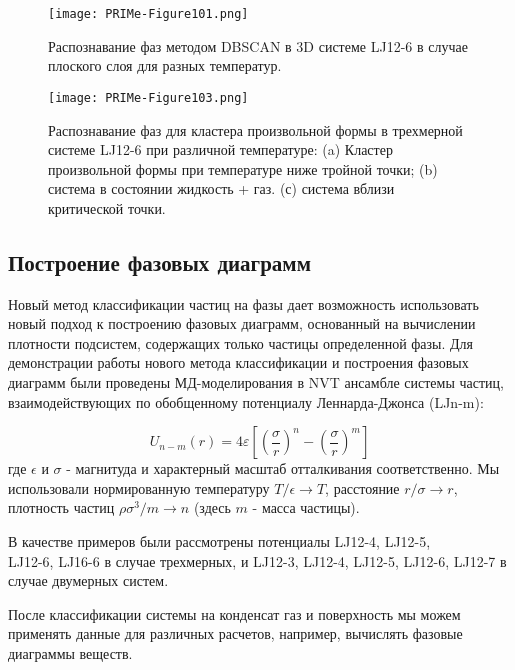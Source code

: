 \begin{figure}[!t]
    \centering
    \texttt{[image: PRIMe-Figure101.png]}
    \caption{Распознавание фаз методом DBSCAN в 3D системе LJ12-6 в случае плоского слоя для разных температур.}
    \label{D3_flat_layer}
\end{figure}


\begin{figure}[!t]
    \centering
    \texttt{[image: PRIMe-Figure103.png]}
    \caption{Распознавание фаз для кластера произвольной формы в трехмерной системе LJ12-6 при различной температуре: (a) Кластер произвольной формы при температуре ниже тройной точки; (b) система в состоянии жидкость + газ. (с) система вблизи критической точки.}
    \label{D3_free_conf}
\end{figure}



\subsection{Построение фазовых диаграмм}
\label{PRIMe-SubSecPhaseDiagram}

Новый метод классификации частиц на фазы дает возможность использовать новый подход к построению фазовых диаграмм, основанный на вычислении плотности подсистем, содержащих только частицы определенной фазы.
Для демонстрации работы нового метода классификации и построения фазовых диаграмм были проведены МД-моделирования в NVT ансамбле системы частиц, взаимодействующих по обобщенному потенциалу Леннарда-Джонса (LJn-m):

\begin{equation}
U_{n-m}(r)=4 \varepsilon\left[\left(\frac{\sigma}{r}\right)^{n}-\left(\frac{\sigma}{r}\right)^{m}\right]
\label{MACR-eq1}
\end{equation}
где $\epsilon$ и $\sigma$ - магнитуда и характерный масштаб отталкивания соответственно.
Мы использовали нормированную температуру $ T/ \epsilon \rightarrow T $, расстояние $ r/ \sigma \rightarrow r $,
плотность частиц $ \rho \sigma ^ 3 / m \rightarrow n$ (здесь $ m $ - масса частицы).

В качестве примеров были рассмотрены потенциалы LJ12-4, LJ12-5, \\ LJ12-6, LJ16-6 в случае трехмерных, и LJ12-3, LJ12-4, LJ12-5, LJ12-6, LJ12-7 в случае двумерных систем.

После классификации системы на конденсат газ и поверхность мы можем применять данные для различных расчетов, например, вычислять фазовые диаграммы веществ.

